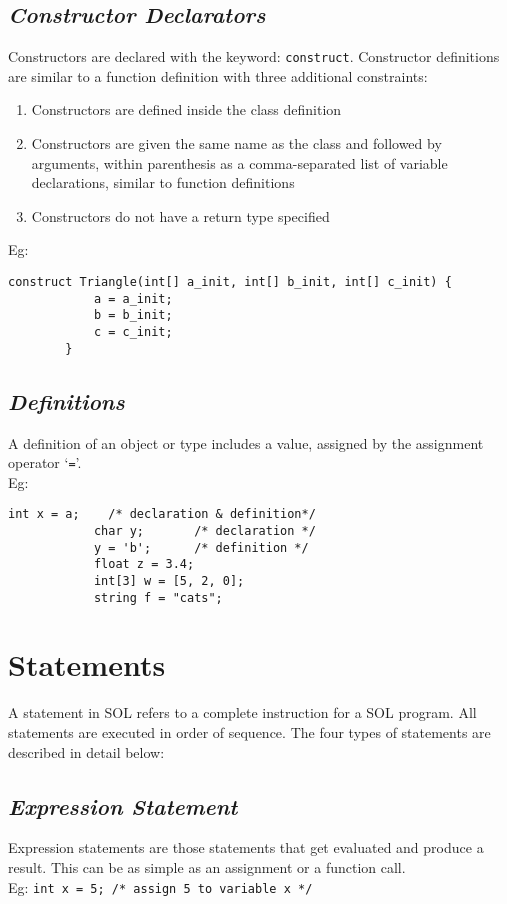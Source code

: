 \documentclass[letterpaper,12pt]{article}
\begin{document}
    \subsection{\textit{Constructor Declarators}}
    Constructors are declared with the keyword: \texttt{construct}. Constructor definitions are similar to a function definition with three additional constraints: 
    \begin{enumerate}
        \itemsep0em
        \item Constructors are defined inside the class definition
        \item Constructors are given the same name as the class and followed by arguments, within parenthesis as a comma-separated list of variable declarations, similar to function definitions
        \item Constructors do not have a return type specified
    \end{enumerate}
    Eg: \begin{lstlisting}[aboveskip=-13pt]
        construct Triangle(int[] a_init, int[] b_init, int[] c_init) {
            a = a_init;
            b = b_init;
            c = c_init;
        }
    \end{lstlisting}

    \subsection{\textit{Definitions}}
    A definition of an object or type includes a value, assigned by the assignment operator `\texttt{=}'.\\
    Eg: \begin{lstlisting}[aboveskip=-13pt]
            int x = a;    /* declaration & definition*/
            char y;       /* declaration */
            y = 'b';      /* definition */
            float z = 3.4;
            int[3] w = [5, 2, 0];
            string f = "cats";
        \end{lstlisting}

\section{Statements} \label{classes}
A statement in SOL refers to a complete instruction for a SOL program. All statements are executed in order of sequence. The four types of statements are described in detail below:\\

\subsection{\textit{Expression Statement}}
Expression statements are those statements that get evaluated and produce a result. This can be as simple as an assignment or a function call.\\
Eg: \texttt{int x = 5; /* assign 5 to variable x */}
\end{document}

